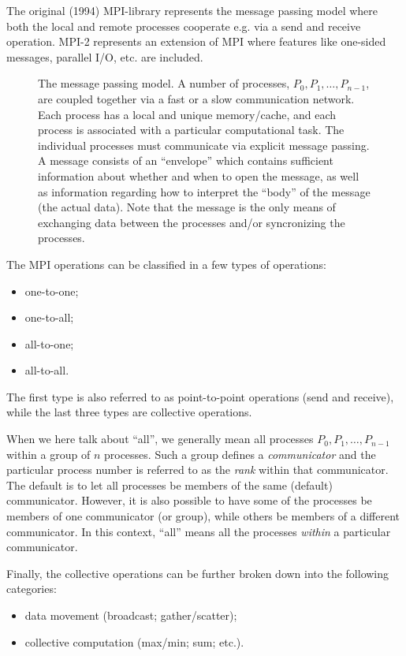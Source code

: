 The original (1994) MPI-library represents the message passing model where both
the local and remote processes cooperate e.g. via a send and receive
operation. MPI-2 represents an extension of MPI where features like one-sided
messages, parallel I/O, etc. are included.

\begin{figure}
  \centering
  
  \caption{
    The message passing model. A number of processes, $P_0, P_1, \ldots,
    P_{n-1}$, are coupled together via a fast or a slow communication network.
    Each process has a local and unique memory/cache, and each process is
    associated with a particular computational task. The individual processes
    must communicate via explicit message passing. A message consists of an
    ``envelope'' which contains sufficient information about whether and when to
    open the message, as well as information regarding how to interpret the
    ``body'' of the message (the actual data). Note that the message is the only
    means of exchanging data between the processes and/or syncronizing the
    processes.
  }
  \label{fig:message_passing_model}
\end{figure}

The MPI operations can be classified in a few types of operations:
\begin{itemize}
\item one-to-one;
\item one-to-all;
\item all-to-one;
\item all-to-all.
\end{itemize}
The first type is also referred to as point-to-point operations (send and
receive), while the last three types are collective operations.

When we here talk about ``all'', we generally mean all processes $P_0, P_1,
\ldots, P_{n-1}$ within a group of $n$ processes. Such a group defines a
\emph{communicator} and the particular process number is referred to as the
\emph{rank} within that communicator. The default is to let all processes be
members of the same (default) communicator. However, it is also possible to have
some of the processes be members of one communicator (or group), while others be
members of a different communicator. In this context, ``all'' means all the
processes \emph{within} a particular communicator.

Finally, the collective operations can be further broken down into the
following categories:
\begin{itemize}
\item data movement (broadcast; gather/scatter);
\item collective computation (max/min; sum; etc.).
\end{itemize}

